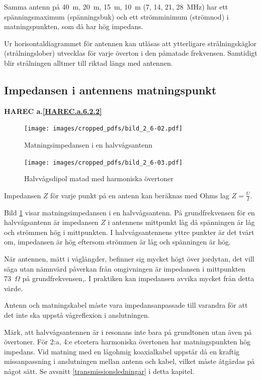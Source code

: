 Samma antenn på 40~m, 20~m, 15~m, 10~m (7, 14, 21, 28~MHz) har ett
spänningsmaximum (spänningsbuk) och ett strömminimum (strömnod) i
matningspunkten, som då har hög impedans.

Ur horisontaldiagrammet för antennen kan utläsas att ytterligare
strålningskäglor (strålningslober) utvecklas för varje överton i den
påmatade frekvensen.
Samtidigt blir strålningen alltmer till riktad längs med antennen.

\subsection{Impedansen i antennens matningspunkt}
\textbf{
HAREC a.\ref{HAREC.a.6.2.2}\label{myHAREC.a.6.2.2}
}

\begin{figure}
  \texttt{[image: images/cropped\_pdfs/bild\_2\_6-02.pdf]}
  \caption{Matningsimpedansen i en halvvågsantenn}
  \label{fig:bildII6-2}
\end{figure}

\begin{figure}
  \texttt{[image: images/cropped\_pdfs/bild\_2\_6-03.pdf]}
  \caption{Halvvågsdipol matad med harmoniska övertoner}
  \label{fig:bildII6-3}
\end{figure}

Impedansen \(Z\) för varje punkt på en antenn kan beräknas med Ohms lag
\(Z = \frac{U}{I}\).

Bild \ref{fig:bildII6-2} visar matningsimpedansen i en halvvågsantenn.
På grundfrekvensen för en halvvågsantenn är impedansen \(Z\) i antennens
mittpunkt låg då spänningen är låg och strömmen hög i mittpunkten.
I halvvågsantennens yttre punkter är det tvärt om, impedansen är hög eftersom
strömmen är låg och spänningen är hög.

När antennen, mätt i våglängder, befinner sig mycket högt över jordytan, det vill säga
utan nämnvärd påverkan från omgivningen är impedansen i mittpunkten 73~\(\Omega\)
på grundfrekvensen,.
I praktiken kan impedansen avvika mycket från detta värde.

Antenn och matningskabel måste vara impedansanpassade till varandra
för att det inte ska uppstå vågreflexion i anslutningen.

Märk, att halvvågsantennen är i resonans inte bara på grundtonen utan även på
övertoner.
För 2:a, 4:e etcetera harmoniska övertonen har matningspunkten hög impedans.
Vid matning med en lågohmig koaxialkabel uppstår då en kraftig missanpassning i
anslutningen mellan antenn och kabel, vilket måste åtgärdas på något sätt.
Se avsnitt \ref{transmissionsledningar} i detta kapitel.

